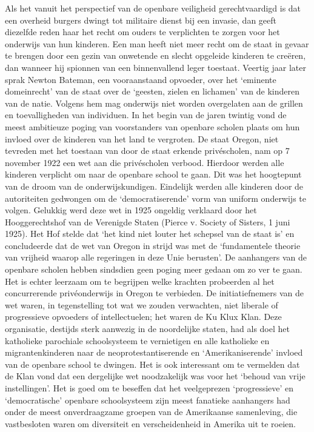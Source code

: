 \documentclass[
  a5paper,
  smalldemyvopaper,10pt,twoside,onecolumn,openright,extrafontsizes,hidelinks]{memoir}
\begin{document}
Als het vanuit het perspectief van de openbare veiligheid
gerechtvaardigd is dat een overheid burgers dwingt tot militaire dienst
bij een invasie, dan geeft diezelfde reden haar het recht om ouders te
verplichten te zorgen voor het onderwijs van hun kinderen. Een man heeft
niet meer recht om de staat in gevaar te brengen door een gezin van
onwetende en slecht opgeleide kinderen te creëren, dan wanneer hij
spionnen van een binnenvallend leger toestaat. Veertig jaar later sprak
Newton Bateman, een vooraanstaand opvoeder, over het `eminente
domeinrecht' van de staat over de `geesten, zielen en lichamen' van de
kinderen van de natie. Volgens hem mag onderwijs niet worden overgelaten
aan de grillen en toevalligheden van individuen. In het begin van de
jaren twintig vond de meest ambitieuze poging van voorstanders van
openbare scholen plaats om hun invloed over de kinderen van het land te
vergroten. De staat Oregon, niet tevreden met het toestaan van door de
staat erkende privéscholen, nam op 7 november 1922 een wet aan die
privéscholen verbood. Hierdoor werden alle kinderen verplicht om naar de
openbare school te gaan. Dit was het hoogtepunt van de droom van de
onderwijskundigen. Eindelijk werden alle kinderen door de autoriteiten
gedwongen om de `democratiserende' vorm van uniform onderwijs te volgen.
Gelukkig werd deze wet in 1925 ongeldig verklaard door het
Hooggerechtshof van de Verenigde Staten (Pierce v. Society of Sisters, 1
juni 1925). Het Hof stelde dat `het kind niet louter het schepsel van de
staat is' en concludeerde dat de wet van Oregon in strijd was met de
`fundamentele theorie van vrijheid waarop alle regeringen in deze Unie
berusten'. De aanhangers van de openbare scholen hebben sindsdien geen
poging meer gedaan om zo ver te gaan. Het is echter leerzaam om te
begrijpen welke krachten probeerden al het concurrerende privéonderwijs
in Oregon te verbieden. De initiatiefnemers van de wet waren, in
tegenstelling tot wat we zouden verwachten, niet liberale of
progressieve opvoeders of intellectuelen; het waren de Ku Klux Klan.
Deze organisatie, destijds sterk aanwezig in de noordelijke staten, had
als doel het katholieke parochiale schoolsysteem te vernietigen en alle
katholieke en migrantenkinderen naar de neoprotestantiserende en
`Amerikaniserende' invloed van de openbare school te dwingen. Het is ook
interessant om te vermelden dat de Klan vond dat een dergelijke wet
noodzakelijk was voor het `behoud van vrije instellingen'. Het is goed
om te beseffen dat het veelgeprezen `progressieve' en `democratische'
openbare schoolsysteem zijn meest fanatieke aanhangers had onder de
meest onverdraagzame groepen van de Amerikaanse samenleving, die
vastbesloten waren om diversiteit en verscheidenheid in Amerika uit te
roeien.
\end{document}
